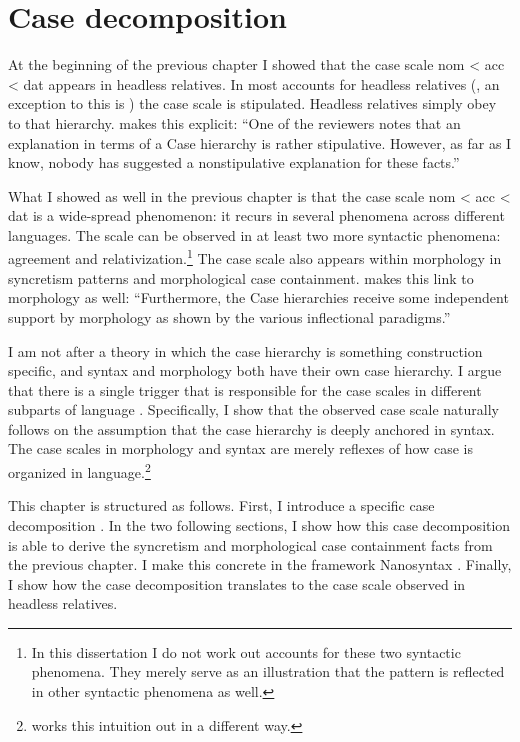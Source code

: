 
\chapter{Case decomposition}\label{ch:decomposition}

At the beginning of the previous chapter I showed that the case scale \ac{nom} < \ac{acc} < \ac{dat} appears in headless relatives. In most accounts for headless relatives (\citealt[cf.][]{pittner1995,vogel2001,grosu2003,harbert1978}, an exception to this is \citealt{himmelreich2017}) the case scale is stipulated. Headless relatives simply obey to that hierarchy.  makes this explicit: ``One of the reviewers notes that an explanation in terms of a Case hierarchy is rather stipulative. However, as far as I know, nobody has suggested a nonstipulative explanation for these facts.''

What I showed as well in the previous chapter is that the case scale \ac{nom} < \ac{acc} < \ac{dat} is a wide-spread phenomenon: it recurs in several phenomena across different languages. The scale can be observed in at least two more syntactic phenomena: agreement and relativization.\footnote{
In this dissertation I do not work out accounts for these two syntactic phenomena. They merely serve as an illustration that the pattern is reflected in other syntactic phenomena as well.}
The case scale also appears within morphology in syncretism patterns and morphological case containment.  makes this link to morphology as well: ``Furthermore, the Case hierarchies receive some independent support by morphology as shown by the various inflectional paradigms.''

I am not after a theory in which the case hierarchy is something construction specific, and syntax and morphology both have their own case hierarchy. I argue that there is a single trigger that is responsible for the case scales in different subparts of language \citep[cf.][on numeral constructions]{caha2019}. Specifically, I show that the observed case scale naturally follows on the assumption that the case hierarchy is deeply anchored in syntax. The case scales in morphology and syntax are merely reflexes of how case is organized in language.\footnote{
\citet{himmelreich2017} works this intuition out in a different way.
}

This chapter is structured as follows. First, I introduce a specific case decomposition \citep{caha2009}. In the two following sections, I show how this case decomposition is able to derive the syncretism and morphological case containment facts from the previous chapter. I make this concrete in the framework Nanosyntax \citep{starke2009}. Finally, I show how the case decomposition translates to the case scale observed in headless relatives.


